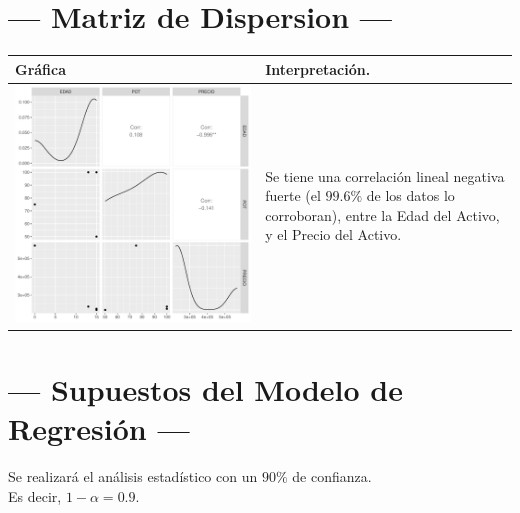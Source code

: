 \documentclass{article}
\begin{document}
\section{\centering --- Matriz de Dispersion ---} %
\begin{center}
  \begin{tabular}{|p{11cm}|p{5cm}|}
    \hline
    Gráfica & Interpretación. \\ \hline 
    \begin{minipage}{\textwidth}
    \includegraphics[width= 0.5 \linewidth, page=1]{r/Rplots.pdf}
    \end{minipage} 
    &
		Se tiene una correlación lineal negativa fuerte (el \(99.6\%\) de los datos lo corroboran),
		entre la Edad del Activo, y el Precio del Activo.
		\\ \hline 
  \end{tabular}
\end{center} 

\newpage

\section{\centering --- Supuestos del Modelo de Regresión ---} %

Se realizará el análisis estadístico con un \(90\%\) de confianza. \\ 
Es decir, \(1- \alpha = 0.9\).
\end{document}
